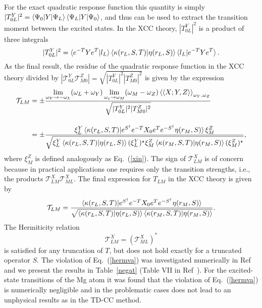 \documentclass[preprint,12pt]{elsarticle}
\newcommand{\TT}{\mathcal{T}}
\newcommand{\equl}[2]{\begin{equation}\label{#2} #1 \end{equation}}
\newcommand{\equsl}[2]{\begin{equation}\begin{split}\label{#2} #1 \end{split}\end{equation}}
\newcommand{\fr}[1]{Eq.~(\ref{#1})}
\newcommand{\Frt}[1]{Table~\ref{#1}}
\newcommand{\quadraom}{\braket{\braket{X;Y,Z}}_{\omega_Y, \omega_Z}}
\newcommand{\esd}{e^{S^\dagger}}
\newcommand{\esdm}{e^{-S^\dagger}}
\newcommand{\etm}{e^{-T}}
\newcommand{\et}{e^{T}}
\newcommand{\karm}{\kappa(r_M, S, T)}
\newcommand{\karl}{\kappa(r_L, S, T)}
\newcommand{\etrl}{\eta(r_L, S)}
\newcommand{\etrm}{\eta(r_M, S)}
\newcommand{\xmz}{X_0}
\begin{document}
For the exact quadratic response function this quantity
is simply $|T_{0L}^Y|^2 = \braket{\Psi_0|Y|\Psi_L}\braket{\Psi_L|Y|\Psi_0}$, and thus can be used to extract
the transition moment between the excited states.
In the XCC theory, $|T_{0L}^Y|^2$ is a product of three integrals
\equl{|T_{0L}^Y|^2  = \braket{\etm Y\et|l_L}\braket{\kappa(r_L, S, T)|\eta(r_L, S)}\braket{l_L|\etm Y\et}. }{ppp}
As the final result, the  residue of the quadratic response
function in the XCC theory divided by $|\TT_{0L}^Y\TT_{M0}^Z| = \sqrt{|T_{0L}^Y|^2|T_{M0}^Z|^2}$ is
given by the expression
\equsl{\TT_{LM}
    & =  \pm\frac{\lim\limits_{\footnotesize{\omega_Y\rightarrow -\omega_L}}(\omega_L + \omega_Y)\lim\limits_{\omega_z\rightarrow \omega_M}(\omega_M - \omega_Z) \quadraom}
    {\sqrt{|T_{0L}^Y|^2|T_{M0}^Z|^2}}\\[10pt]
    &= 
  \pm\frac{\xi_L^Y\braket{\karl|\esd\etm \xmz\et\esdm \etrm}\xi_M^Z}
    {\sqrt{\xi_L^Y \braket{\karl|\etrl}(\xi_L^Y)^{\star}\xi_M^Z \braket{\karm|\etrm}(\xi_M^Z)^{\star}}},
}{tkn}
where $\xi_M^Z$ is defined analogously as \fr{xin}.
The sign of $\TT_{LM}^X$ is 
of concern because in practical applications one
requires only the transition strengths, i.e., the products $\TT^X_{LM}\TT^X_{ML}$.
The final expression for
$T_{LM}$ in the XCC theory is given by
\equl{\TT_{LM}
     = \frac{\braket{\karl|\esd\etm \xmz\et\esdm \etrm}}{\sqrt{\braket{\karl|\etrl}\braket{\karm|\etrm}}}.
}{glowne2}
The Hermiticity relation
\equl{\TT^X_{LM} = (\TT^X_{ML})^*
}{hermva}
is satisfied for any truncation of $T$, but does not hold exactly for a truncated  operator $S$.
 The violation of \fr{hermva} was investigated numerically
 in Ref~\citep{tucholska2017transition} and we present the results in \Frt{negat} (Table VII in Ref~\citep{tucholska2017transition}).
 For the excited-state transitions of the Mg atom
it was found  that the violation of \fr{hermva} is numerically negligible and in the problematic cases 
 does not lead to an unphysical results as in the TD-CC method.
\end{document}
